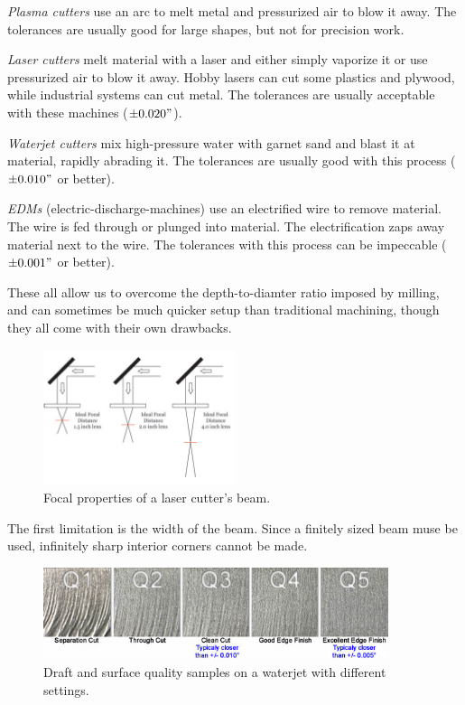 \documentclass[10pt,letterpaper]{book}
\begin{document}
 \begin{asparaenum}[a)]
  	\item \textit{Plasma cutters} use an arc to melt metal and pressurized air to blow it away. The tolerances are usually good for large shapes, but not for precision work.
 	\item \textit{Laser cutters} melt material with a laser and either simply vaporize it or use pressurized air to blow it away. Hobby lasers can cut some plastics and plywood, while industrial systems can cut metal. The tolerances are usually acceptable with these machines ($\pm 0.020"$).
 	\item \textit{Waterjet cutters} mix high-pressure water with garnet sand and blast it at material, rapidly abrading it. The tolerances are usually good with this process ($\pm 0.010"$ or better).
 	\item \textit{EDMs} (electric-discharge-machines) use an electrified wire to remove material. The wire is fed through or plunged into material. The electrification zaps away material next to the wire. The tolerances with this process can be impeccable ($\pm 0.001"$ or better). 
\end{asparaenum}
 	
 	These all allow us to overcome the depth-to-diamter ratio imposed by milling, and can sometimes be much quicker setup than traditional machining, though they all come with their own drawbacks.
 
 \begin{figure}[H] \centering
 	\includegraphics[width=0.5\textwidth]{imgs/lasercut_focus.jpeg}
 	\caption{Focal properties of a laser cutter's beam.}
 \end{figure}
 
  The first limitation is the width of the beam. Since a finitely sized beam muse be used, infinitely sharp interior corners cannot be made.
 
 \begin{figure}[H] \centering
 	\includegraphics[width=0.9\textwidth]{imgs/waterjet_draft.jpeg}
 	\caption{Draft and surface quality samples on a waterjet with different settings.}
 \end{figure}
 
\end{document}
